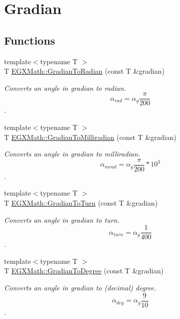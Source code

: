 \hypertarget{group___e_g_x_math-_angle_conversions-_gradian}{}\section{Gradian}
\label{group___e_g_x_math-_angle_conversions-_gradian}
\subsection*{Functions}
\begin{DoxyCompactItemize}
\item 
{\footnotesize template$<$typename T $>$ }\\T \mbox{\hyperlink{group___e_g_x_math-_angle_conversions-_gradian_ga7ea0a6f47a672715b960181606c8fd7b}{E\+G\+X\+Math\+::\+Gradian\+To\+Radian}} (const T \&gradian)
\begin{DoxyCompactList}\small\item\em Converts an angle in gradian to radian. \[\alpha_{rad}=\alpha_{g}\frac{\pi}{200}\]. \end{DoxyCompactList}\item 
{\footnotesize template$<$typename T $>$ }\\T \mbox{\hyperlink{group___e_g_x_math-_angle_conversions-_gradian_ga144f1019dc760268a163d81fcb3ce482}{E\+G\+X\+Math\+::\+Gradian\+To\+Milliradian}} (const T \&gradian)
\begin{DoxyCompactList}\small\item\em Converts an angle in gradian to milliradian. \[\alpha_{mrad}=\alpha_{g}\frac{\pi}{200}*10^3\]. \end{DoxyCompactList}\item 
{\footnotesize template$<$typename T $>$ }\\T \mbox{\hyperlink{group___e_g_x_math-_angle_conversions-_gradian_ga11b42138910d26474f47c0a2043911c9}{E\+G\+X\+Math\+::\+Gradian\+To\+Turn}} (const T \&gradian)
\begin{DoxyCompactList}\small\item\em Converts an angle in gradian to turn. \[\alpha_{turn}=\alpha_{g}\frac{1}{400}\]. \end{DoxyCompactList}\item 
{\footnotesize template$<$typename T $>$ }\\T \mbox{\hyperlink{group___e_g_x_math-_angle_conversions-_gradian_gaa284952274f16d225951cf5139d0ff4e}{E\+G\+X\+Math\+::\+Gradian\+To\+Degree}} (const T \&gradian)
\begin{DoxyCompactList}\small\item\em Converts an angle in gradian to (decimal) degree. \[\alpha_{deg}=\alpha_{g}\frac{9}{10}\]. \end{DoxyCompactList}\item 

\end{DoxyCompactItemize}
